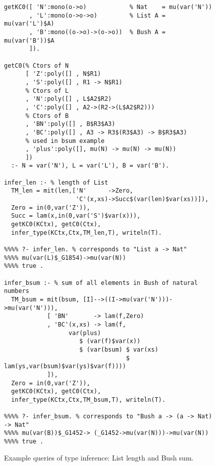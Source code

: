 \documentclass[runningheads,a4paper]{llncs}
\newcommand{\TODO}[1]{\textcolor{magenta}{TODO: #1}}
\begin{document}


\begin{figure}\small
\begin{verbatim}
getKC0([ 'N':mono(o->o)            % Nat    = mu(var('N'))
       , 'L':mono(o->o->o)         % List A = mu(var('L')$A)
       , 'B':mono((o->o)->(o->o))  % Bush A = mu(var('B'))$A
       ]).

getC0(% Ctors of N
      [ 'Z':poly([] , N$R1)
      , 'S':poly([] , R1 -> N$R1)
      % Ctors of L
      , 'N':poly([] , L$A2$R2)
      , 'C':poly([] , A2->(R2->(L$A2$R2)))
      % Ctors of B
      , 'BN':poly([] , B$R3$A3)
      , 'BC':poly([] , A3 -> R3$(R3$A3) -> B$R3$A3)
      % used in bsum example
      , 'plus':poly([], mu(N) -> mu(N) -> mu(N))
      ])
  :- N = var('N'), L = var('L'), B = var('B').

infer_len :- % length of List
  TM_len = mit(len,['N'      ->Zero,
                    'C'(x,xs)->Succ$(var(len)$var(xs))]),
  Zero = in(0,var('Z')),
  Succ = lam(x,in(0,var('S')$var(x))),
  getKC0(KCtx), getC0(Ctx),
  infer_type(KCtx,Ctx,TM_len,T), writeln(T).

%%%% ?- infer_len. % corresponds to "List a -> Nat"
%%%% mu(var(L)$_G1854)->mu(var(N))
%%%% true .

infer_bsum :- % sum of all elements in Bush of natural numbers
  TM_bsum = mit(bsum, [I]-->((I->mu(var('N')))->mu(var('N'))),
            [ 'BN'       -> lam(f,Zero)
            , 'BC'(x,xs) -> lam(f,
                  var(plus)
                     $ (var(f)$var(x))
                     $ (var(bsum) $ var(xs)
                                  $ lam(ys,var(bsum)$var(ys)$var(f))))
            ]),
  Zero = in(0,var('Z')),
  getKC0(KCtx), getC0(Ctx),
  infer_type(KCtx,Ctx,TM_bsum,T), writeln(T).

%%%% ?- infer_bsum. % corresponds to "Bush a -> (a -> Nat) -> Nat"
%%%% mu(var(B))$_G1452-> (_G1452->mu(var(N)))->mu(var(N))
%%%% true .
\end{verbatim}
\caption{Example queries of type inference: List length and Bush sum.}
\label{fig:TIexample}
\end{figure}
\end{document}
